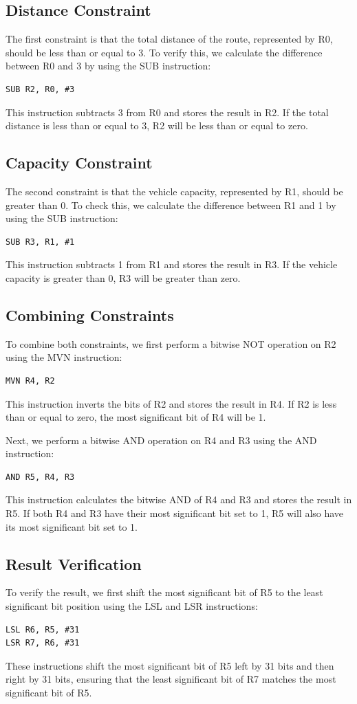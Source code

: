 \subsection{Distance Constraint}
The first constraint is that the total distance of the route, represented by R0, should be less than or equal to 3. To verify this, we calculate the difference between R0 and 3 by using the SUB instruction:
\begin{verbatim}
SUB R2, R0, #3
\end{verbatim}
This instruction subtracts 3 from R0 and stores the result in R2. If the total distance is less than or equal to 3, R2 will be less than or equal to zero.

\subsection{Capacity Constraint}
The second constraint is that the vehicle capacity, represented by R1, should be greater than 0. To check this, we calculate the difference between R1 and 1 by using the SUB instruction:
\begin{verbatim}
SUB R3, R1, #1
\end{verbatim}
This instruction subtracts 1 from R1 and stores the result in R3. If the vehicle capacity is greater than 0, R3 will be greater than zero.

\subsection{Combining Constraints}
To combine both constraints, we first perform a bitwise NOT operation on R2 using the MVN instruction:
\begin{verbatim}
MVN R4, R2
\end{verbatim}
This instruction inverts the bits of R2 and stores the result in R4. If R2 is less than or equal to zero, the most significant bit of R4 will be 1.

Next, we perform a bitwise AND operation on R4 and R3 using the AND instruction:
\begin{verbatim}
AND R5, R4, R3
\end{verbatim}
This instruction calculates the bitwise AND of R4 and R3 and stores the result in R5. If both R4 and R3 have their most significant bit set to 1, R5 will also have its most significant bit set to 1.

\subsection{Result Verification}
To verify the result, we first shift the most significant bit of R5 to the least significant bit position using the LSL and LSR instructions:
\begin{verbatim}
LSL R6, R5, #31
LSR R7, R6, #31
\end{verbatim}
These instructions shift the most significant bit of R5 left by 31 bits and then right by 31 bits, ensuring that the least significant bit of R7 matches the most significant bit of R5.

